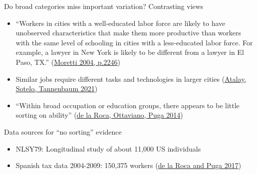 \documentclass[11pt,notes=hide,aspectratio=169]{beamer}
\begin{document}
\begin{frame}{Do broad categories miss important variation?}
Contrasting views
\begin{itemize}
	\item  ``Workers in cities with a well-educated labor force are likely to have unobserved characteristics that make them more productive than workers with the same level of schooling in cities with a less-educated labor force. For example, a lawyer in New York is likely to be different from a lawyer in El Paso, TX.'' (\href{https://ideas.repec.org/h/eee/regchp/4-51.html}{Moretti 2004, p.2246})
	\item[] {\small Similar jobs require different tasks and technologies in larger cities (\href{http://www-personal.umich.edu/~ssotelo/research/AST_geography.pdf}{Atalay, Sotelo, Tannenbaum 2021})}
	\item ``Within broad occupation or education groups, there appears to be little sorting on ability'' (\href{http://diegopuga.org/research/dreams.pdf}{de la Roca, Ottaviano, Puga 2014})
\end{itemize}
Data sources for ``no sorting'' evidence
\begin{itemize}
	\item NLSY79: Longitudinal study of about 11,000 US individuals
	\item Spanish tax data 2004-2009: 150,375 workers (\href{https://academic.oup.com/restud/article/84/1/106/2669971}{de la Roca and Puga 2017})
\end{itemize}
\end{frame}
\end{document}

